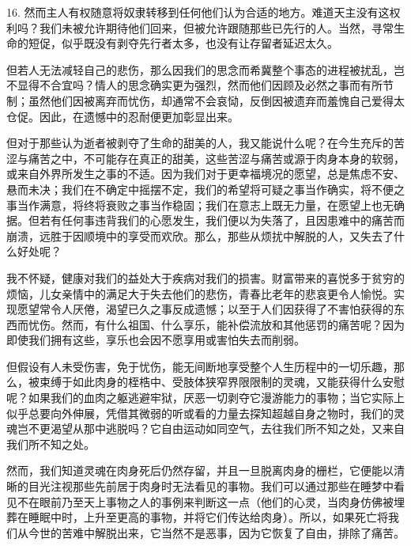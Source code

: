 16. 然而主人有权随意将奴隶转移到任何他们认为合适的地方。难道天主没有这权利吗？我们未被允许期待他们回来，但被允许跟随那些已先行的人。当然，寻常生命的短促，似乎既没有剥夺先行者太多，也没有让存留者延迟太久。\par

但若人无法减轻自己的悲伤，那么因我们的思念而希冀整个事态的进程被扰乱，岂不显得不合宜吗？情人的思念确实更为强烈，然而他们因顾及必然之事而有所节制；虽然他们因被离弃而忧伤，却通常不会哀恸，反倒因被遗弃而羞愧自己爱得太仓促。因此，在遗憾中的忍耐便更加彰显出来。\par

但对于那些认为逝者被剥夺了生命的甜美的人，我又能说什么呢？在今生充斥的苦涩与痛苦之中，不可能存在真正的甜美，这些苦涩与痛苦或源于肉身本身的软弱，或来自外界所发生之事的不适。因为我们对于更幸福境况的愿望，总是焦虑不安、悬而未决；我们在不确定中摇摆不定，我们的希望将可疑之事当作确实，将不便之事当作满意，将终将衰败之事当作稳固；我们在意志上既无力量，在愿望上也无确据。但若有任何事违背我们的心愿发生，我们便以为失落了，且因患难中的痛苦而崩溃，远胜于因顺境中的享受而欢欣。那么，那些从烦扰中解脱的人，又失去了什么好处呢？\par

我不怀疑，健康对我们的益处大于疾病对我们的损害。财富带来的喜悦多于贫穷的烦恼，儿女亲情中的满足大于失去他们的悲伤，青春比老年的悲哀更令人愉悦。实现愿望常令人厌倦，渴望已久之事反成遗憾；以至于人们因获得了不害怕获得的东西而忧伤。然而，有什么祖国、什么享乐，能补偿流放和其他惩罚的痛苦呢？因为即使我们拥有这些，享乐也会因不愿享用或害怕失去而削弱。\par

但假设有人未受伤害，免于忧伤，能无间断地享受整个人生历程中的一切乐趣，那么，被束缚于如此肉身的桎梏中、受肢体狭窄界限限制的灵魂，又能获得什么安慰呢？如果我们的血肉之躯逃避牢狱，厌恶一切剥夺它漫游能力的事物；当它实际上似乎总要向外伸展，凭借其微弱的听或看的力量去探知超越自身之物时，我们的灵魂岂不更渴望从那中逃脱吗？它自由运动如同空气，去往我们所不知之处，又来自我们所不知之处。\par

然而，我们知道灵魂在肉身死后仍然存留，并且一旦脱离肉身的栅栏，它便能以清晰的目光注视那些先前居于肉身时无法看见的事物。我们可以通过那些在睡梦中看见不在眼前乃至天上事物之人的事例来判断这一点（他们的心灵，当肉身仿佛被埋葬在睡眠中时，上升至更高的事物，并将它们传达给肉身）。所以，如果死亡将我们从今世的苦难中解脱出来，它当然不是恶事，因为它恢复了自由，排除了痛苦。\par

